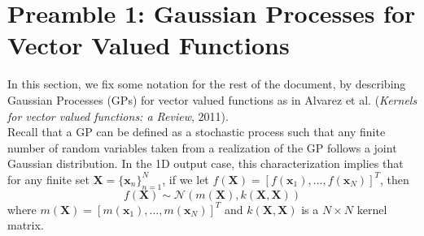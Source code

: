 \documentclass[11pt,a4paper]{article}
\begin{document}


\section*{Preamble 1: Gaussian Processes for Vector Valued Functions}
In this section, we fix some notation for the rest of the document, by describing Gaussian Processes (GPs) for vector valued functions as in Alvarez et al. (\textit{Kernels for vector valued functions: a Review}, 2011). \\

Recall that a GP can be defined as a stochastic process such that any finite number of random variables taken from a realization of the GP follows a joint Gaussian distribution. In the 1D output case, this characterization implies that for any finite set $\textbf{X} = \{\textbf{x}_n\}_{n=1}^N$, if we let $f(\textbf{X}) = [f(\textbf{x}_1), \ldots, f(\textbf{x}_N)]^T$, then 
$$
f(\textbf{X}) \sim \mathcal{N}(m(\textbf{X}), k(\textbf{X}, \textbf{X}))
$$
where $m(\textbf{X}) = [m(\textbf{x}_1), \ldots, m(\textbf{x}_N)]^T$ and $k(\textbf{X}, \textbf{X})$ is a $N \times N$ kernel matrix.
\end{document}
